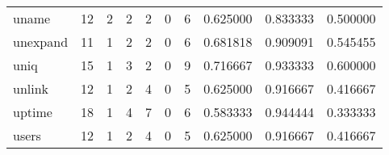 \begin{tabular}{lrrrrrrrrr}
uname     &                                      12 &                                                  2 &                                                  2 &                                                  2 &                                                  0 &                                                  6 &                                           0.625000 &                               0.833333 &                             0.500000 \\
unexpand  &                                      11 &                                                  1 &                                                  2 &                                                  2 &                                                  0 &                                                  6 &                                           0.681818 &                               0.909091 &                             0.545455 \\
uniq      &                                      15 &                                                  1 &                                                  3 &                                                  2 &                                                  0 &                                                  9 &                                           0.716667 &                               0.933333 &                             0.600000 \\
unlink    &                                      12 &                                                  1 &                                                  2 &                                                  4 &                                                  0 &                                                  5 &                                           0.625000 &                               0.916667 &                             0.416667 \\
uptime    &                                      18 &                                                  1 &                                                  4 &                                                  7 &                                                  0 &                                                  6 &                                           0.583333 &                               0.944444 &                             0.333333 \\
users     &                                      12 &                                                  1 &                                                  2 &                                                  4 &                                                  0 &                                                  5 &                                           0.625000 &                               0.916667 &                             0.416667 \\

\end{tabular}
